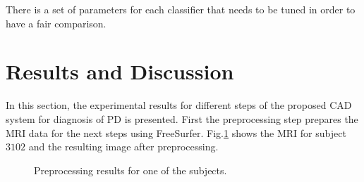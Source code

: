 \documentclass[runningheads,a4paper]{llncs}
\begin{document}
There is a set of parameters for each classifier that needs to be tuned in order to have a fair comparison.

\section{Results and Discussion}
In this section, the experimental results for different steps of the proposed CAD system for diagnosis of PD is presented. First the preprocessing step prepares the MRI data for the next steps using FreeSurfer. Fig.\ref{fig:prepres} shows the MRI for subject $3102$ and the resulting image after preprocessing.

\begin{figure}[!h]\small
  \centering
  \hfill
  \caption{Preprocessing results for one of the subjects.}
  \label{fig:prepres}
\end{figure}
\end{document}
